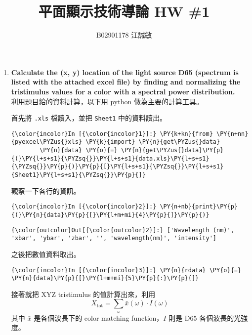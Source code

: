 \documentclass[12pt, a4paper]{article}
\title{平面顯示技術導論 HW \#1}
\author{B02901178 江誠敏}
\begin{document}


\maketitle

\begin{enumerate}[label={\bf (\alph*)}, leftmargin=0pt]
  \item {\bf Calculate the (x, y) location of the light source D65 (spectrum is listed with the attached excel file) 
      by finding and normalizing the tristimulus values for a color with a spectral power distribution.} \\

    利用題目給的資料計算，以下用 python 做為主要的計算工具。

    首先將 \texttt{.xls} 檔讀入，並把 \texttt{Sheet1} 中的資料讀出。
    \begin{Verbatim}[commandchars=\\\{\}]
{\color{incolor}In [{\color{incolor}1}]:} \PY{k+kn}{from} \PY{n+nn}{pyexcel\PYZus{}xls} \PY{k}{import} \PY{n}{get\PYZus{}data}
        \PY{n}{data} \PY{o}{=} \PY{n}{get\PYZus{}data}\PY{p}{(}\PY{l+s+s1}{\PYZsq{}}\PY{l+s+s1}{data.xls}\PY{l+s+s1}{\PYZsq{}}\PY{p}{)}\PY{p}{[}\PY{l+s+s1}{\PYZsq{}}\PY{l+s+s1}{Sheet1}\PY{l+s+s1}{\PYZsq{}}\PY{p}{]}
\end{Verbatim}

    觀察一下各行的資訊。
    \begin{Verbatim}[commandchars=\\\{\}]
{\color{incolor}In [{\color{incolor}2}]:} \PY{n+nb}{print}\PY{p}{(}\PY{n}{data}\PY{p}{[}\PY{l+m+mi}{4}\PY{p}{]}\PY{p}{)}
\end{Verbatim}

            \begin{Verbatim}[commandchars=\\\{\}]
{\color{outcolor}Out[{\color{outcolor}2}]:} ['Wavelength (nm)', 'xbar', 'ybar', 'zbar', '', 'wavelength(nm)', 'intensity']
\end{Verbatim}

    之後把數值資料取出。
    \begin{Verbatim}[commandchars=\\\{\}]
{\color{incolor}In [{\color{incolor}3}]:} \PY{n}{rdata} \PY{o}{=} \PY{n}{data}\PY{p}{[}\PY{l+m+mi}{5}\PY{p}{:}\PY{p}{]}
\end{Verbatim}

    接著就把 XYZ tristimulus 的值計算出來，利用
    \[ X_\text{tot} = \sum_\omega \bar{x}(\omega) \cdot I(\omega) \]
    其中 $\bar{x}$ 是各個波長下的 color matching function，$I$ 則是 D65 各個波長的光強度。 


\end{enumerate}
\end{document}
